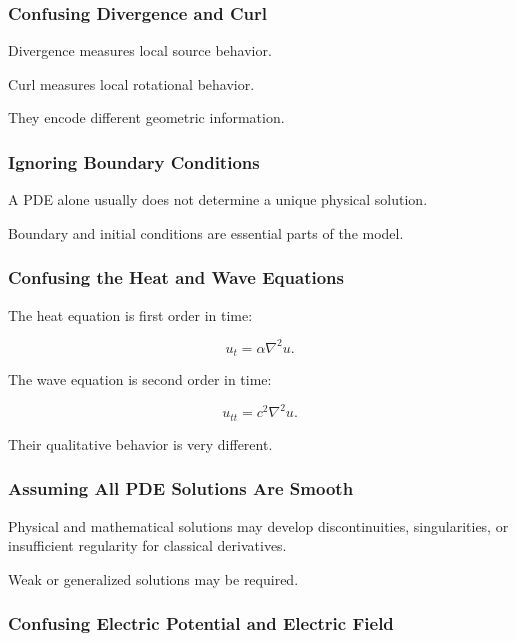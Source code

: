 \subsubsection{Confusing Divergence and Curl}

Divergence measures local source behavior.

Curl measures local rotational behavior.

They encode different geometric information.

\subsubsection{Ignoring Boundary Conditions}

A PDE alone usually does not determine a unique physical solution.

Boundary and initial conditions are essential parts of the model.

\subsubsection{Confusing the Heat and Wave Equations}

The heat equation is first order in time:

\[
u_t=\alpha\nabla^2u.
\]

The wave equation is second order in time:

\[
u_{tt}=c^2\nabla^2u.
\]

Their qualitative behavior is very different.

\subsubsection{Assuming All PDE Solutions Are Smooth}

Physical and mathematical solutions may develop discontinuities,
singularities, or insufficient regularity for classical derivatives.

Weak or generalized solutions may be required.

\subsubsection{Confusing Electric Potential and Electric Field}

